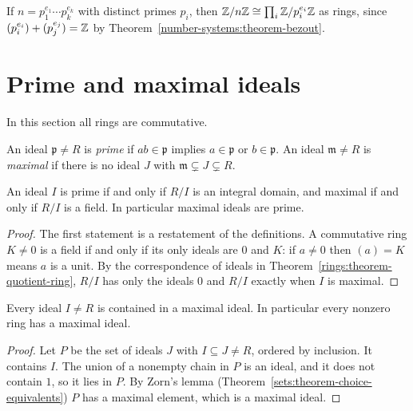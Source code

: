 \begin{example}\label{rings:example-crt-integers}
If $n = p_1^{e_1} \cdots p_k^{e_k}$ with distinct primes $p_i$, then
$\mathbb{Z}/n\mathbb{Z} \cong \prod_i \mathbb{Z}/p_i^{e_i}\mathbb{Z}$ as rings, since $(p_i^{e_i}) + (p_j^{e_j}) = \mathbb{Z}$ by
Theorem~\ref{number-systems:theorem-bezout}.
\end{example}

\section{Prime and maximal ideals}\label{rings:section-prime-maximal}

In this section all rings are commutative.

\begin{definition}\label{rings:definition-prime-maximal}
An ideal $\mathfrak{p} \neq R$ is \emph{prime} if $ab \in \mathfrak{p}$ implies $a \in \mathfrak{p}$
or $b \in \mathfrak{p}$. An ideal $\mathfrak{m} \neq R$ is \emph{maximal} if there is no ideal $J$
with $\mathfrak{m} \subsetneq J \subsetneq R$.
\end{definition}

\begin{proposition}\label{rings:proposition-prime-maximal-quotients}
An ideal $I$ is prime if and only if $R/I$ is an integral domain, and maximal if and
only if $R/I$ is a field. In particular maximal ideals are prime.
\end{proposition}

\begin{proof}
The first statement is a restatement of the definitions. A commutative ring
$K \neq 0$ is a field if and only if its only ideals are $0$ and $K$: if $a \neq 0$ then
$(a) = K$ means $a$ is a unit. By the correspondence of ideals in
Theorem~\ref{rings:theorem-quotient-ring}, $R/I$ has only the ideals $0$ and $R/I$
exactly when $I$ is maximal.
\end{proof}

\begin{theorem}[Krull]\label{rings:theorem-maximal-ideals-exist}
Every ideal $I \neq R$ is contained in a maximal ideal. In particular every nonzero
ring has a maximal ideal.
\end{theorem}

\begin{proof}
Let $P$ be the set of ideals $J$ with $I \subseteq J \neq R$, ordered by inclusion. It
contains $I$. The union of a nonempty chain in $P$ is an ideal, and it does not
contain $1$, so it lies in $P$. By Zorn's lemma
(Theorem~\ref{sets:theorem-choice-equivalents}) $P$ has a maximal element, which is
a maximal ideal.
\end{proof}

